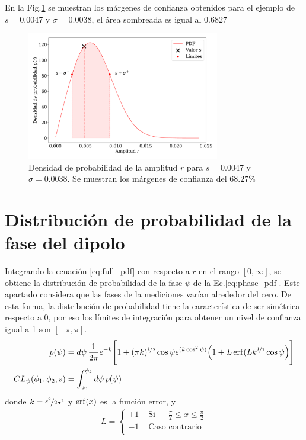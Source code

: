 En la Fig.\ref{margenes} se muestran los márgenes de confianza obtenidos para el ejemplo de $s=0.0047$ y $\sigma=0.0038$, el área sombreada es igual al $0.6827$
\begin{figure}[H]
    \begin{small}
        \begin{center}
            \includegraphics[width=0.75\textwidth]{bessel_prob_ej_v2.pdf}
        \end{center}
        \caption{Densidad de probabilidad de la amplitud $r$ para $s=0.0047$ y $\sigma=0.0038$. Se muestran los márgenes de confianza del $68.27\%$ }
        \label{margenes}
    \end{small}
\end{figure}

\section{Distribución de probabilidad de la fase del dipolo}

Integrando la ecuación \ref{eq:full_pdf} con respecto a $r$ en el rango $[0,\infty]$, se obtiene la distribución de probabilidad de la fase $\psi$ de la Ec.\ref{eq:phase_pdf}. Este apartado considera que las fases de la mediciones varían alrededor del cero. De esta forma, la distribución de probabilidad tiene la característica  de ser simétrica respecto a 0, por eso los límites de integración para obtener un nivel de confianza igual a 1 son $[-\pi, \pi]$.
\begin{align}
    p(\psi) &=d\psi\,\frac{1}{2\pi}e^{-k} \Bigg[ 1 + (\pi k)^{\nicefrac{1}{2}} \cos\psi e^{(k\cos^2\psi)} \Big( 1 + L \erf(L k^{\nicefrac{1}{2}} \cos\psi \Big) \Bigg ] \\ \label{eq:phase_pdf}
    CL_{\psi}(\phi_1, \phi_2, s) &= \int_{\phi_1}^{\phi_2} d\psi \, p(\psi)
\end{align}  
donde $k =\nicefrac{s^2}{2\sigma^2}$ y $\erf (x)$ es la función error, y
\begin{align*}
    L =
    \begin{cases} 
        +1 & \text{ Si } -\frac{\pi}{2} \leq x\leq \frac{\pi}{2} \\
        -1 & \text{ Caso contrario }  \\
     \end{cases}
\end{align*}

